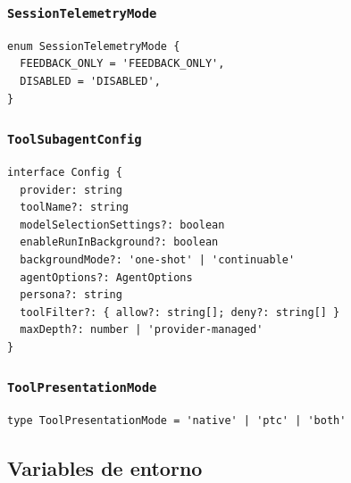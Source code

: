 \documentclass[11pt,a4paper]{article}
\begin{document}
\subsubsection*{\texttt{SessionTelemetryMode}}


\begin{lstlisting}
enum SessionTelemetryMode {
  FEEDBACK_ONLY = 'FEEDBACK_ONLY',
  DISABLED = 'DISABLED',
}
\end{lstlisting}


\subsubsection*{\texttt{ToolSubagentConfig}}


\begin{lstlisting}
interface Config {
  provider: string
  toolName?: string
  modelSelectionSettings?: boolean
  enableRunInBackground?: boolean
  backgroundMode?: 'one-shot' | 'continuable'
  agentOptions?: AgentOptions
  persona?: string
  toolFilter?: { allow?: string[]; deny?: string[] }
  maxDepth?: number | 'provider-managed'
}
\end{lstlisting}


\subsubsection*{\texttt{ToolPresentationMode}}


\begin{lstlisting}
type ToolPresentationMode = 'native' | 'ptc' | 'both'
\end{lstlisting}


\subsection*{Variables de entorno}


\end{document}

